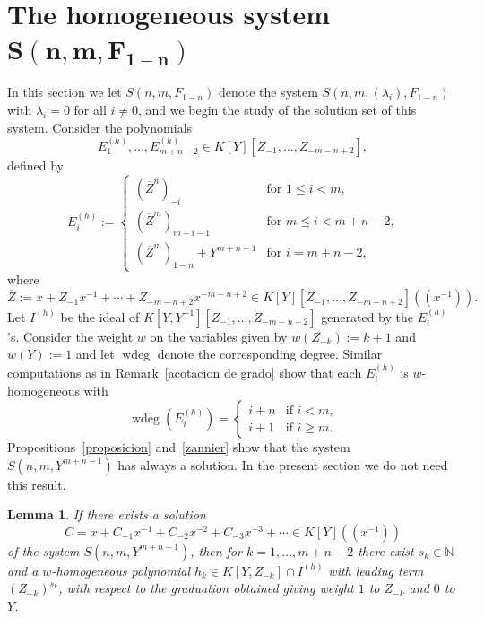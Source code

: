 \documentclass[reqno,a4paper]{amsart}
\newtheorem{lemma}[theorem]{Lemma}
\theoremstyle{definition}
\theoremstyle{remark}
\DeclareMathOperator{\wdeg}{wdeg}
\newcommand{\ov}{\overline}
\begin{document}
\section[The homogeneous system $S(n,m,F_{1-n})$]{The homogeneous system $\bm{S(n,m,F_{1-n})}$}
\label{homogeneos}
%
\setcounter{equation}{0}
%
In this section we let $S(n,m,F_{1-n})$ denote the system $S(n,m,(\lambda_i),F_{1-n})$ with
$\lambda_i = 0$ for all $i\ne 0$, and we begin the study of the solution set of this system.
Consider the polynomials
$$
E^{(h)}_1,\dots,E^{(h)}_{m+n-2}\in K[Y][Z_{-1},\dots,Z_{-m-n+2}],
$$
defined by
\begin{equation}\label{Ehomogeneo}
E^{(h)}_i := \begin{cases} (\ov{Z}^n)_{-i} &\text{for $1\le i < m$,}\\[5pt] (\ov{Z}^m)_{m-i-1} &
\text{for $m\le i< m+n-2$,} \\[5pt] (\ov{Z}^m)_{1-n}+Y^{m+n-1} &\text{for $i=m+n-2$,}\end{cases}
\end{equation}
where
$$
\ov{Z} := x + Z_{-1} x^{-1} + \cdots + Z_{-m-n+2}x^{-m-n+2} \in K[Y][Z_{-1},\dots,Z_{-m-n+2}]((x^{-1})).
$$
Let $I^{(h)}$ be the ideal of $K[Y,Y^{-1}][Z_{-1},\dots,Z_{-m-n+2}]$ generated by the $E_i^{(h)}$'s.
Consider the weight $w$ on the variables given by $w(Z_{-k}):=k+1$ and $w(Y):=1$ and let $\wdeg$
denote the corresponding degree. Similar computations as in Remark~\ref{acotacion de grado} show
that each $E_i^{(h)}$ is $w$-homogeneous with
$$
\wdeg(E_i^{(h)})=\begin{cases}i+n &\text{if $i<m$,}\\ i+1 &\text{if $i\ge m$.}\end{cases}
$$
Propositions~\ref{proposicion} and~\ref{zannier} show that the system $S(n,m,Y^{m+n-1})$ has always a solution.
In the present section we do not need this result.

\begin{lemma}\label{polinomiounivariado} If there exists a solution
$$
C = x + C_{-1} x^{-1} + C_{-2} x^{-2} + C_{-3} x^{-3}+\cdots \in K[Y]((x^{-1}))
$$
of the system $S(n,m,Y^{m+n-1})$, then for $k\!=\!1,\dots,m\!+\!n\!-\!2$ there exist
$s_k\in \mathds{N}$ and a $w$-ho\-mo\-ge\-neous polynomial $h_k\in K[Y,Z_{-k}]\cap I^{(h)}$
with leading term $(Z_{-k})^{s_k}$, with respect to the graduation obtained giving weight
$1$ to $Z_{-k}$ and $0$ to $Y$.
\end{lemma}
\end{document}

